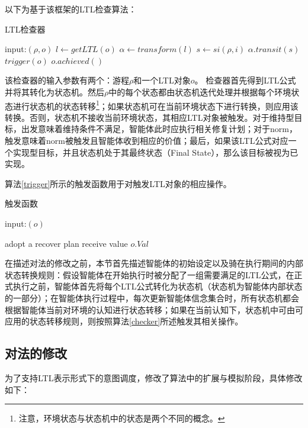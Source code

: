 以下为基于该框架的LTL检查算法：
\begin{algorithm} %
\caption{LTL检查器}\label{checker}
\begin{algorithmic}[1]
\STATE input:$(\rho, o)$
\STATE $l \gets getLTL(o)$
\STATE $\alpha \gets transform(l)$ 
  \STATE $s \gets si(\rho, i)$
    \STATE $\alpha.transit(s)$
    \ELSE
    \STATE $trigger(o)$
  \ENDIF
\ENDFOR
{}
  \STATE $o.achieved()$
\ENDIF
\end{algorithmic}
\end{algorithm}
该检查器的输入参数有两个：游程$\rho$和一个LTL对象$o$。
%
检查器首先得到LTL公式并将其转化为状态机。然后$\rho$中的每个状态都由状态机迭代处理并根据每个环境状态进行状态机的状态转移\footnote{注意，环境状态与状态机中的状态是两个不同的概念。}；如果状态机可在当前环境状态下进行转换，则应用该转换。否则，状态机不接收当前环境状态，其相应LTL对象被触发。对于维持型目标，出发意味着维持条件不满足，智能体此时应执行相关修复计划；对于norm，触发意味着norm被触发且智能体收到相应的价值；最后，如果该LTL公式对应一个实现型目标，并且状态机处于其最终状态（Final State），那么该目标被视为已实现。

算法\ref{trigger}所示的触发函数用于对触发LTL对象的相应操作。
\begin{algorithm} %
\caption{触发函数}\label{trigger}
\begin{algorithmic}[1]
\STATE input:$(o)$

\STATE adopt a recover plan
\ELSE
{}
\STATE receive value $o.Val$
\ENDIF
\ENDIF

\end{algorithmic}
\end{algorithm}

在描述对\SA 法的修改之前，本节首先描述智能体的初始设定以及骑在执行期间的内部状态转换规则：假设智能体在开始执行时被分配了一组需要满足的LTL公式，在正式执行之前，智能体首先将每个LTL公式转化为状态机（状态机为智能体内部状态的一部分）；在智能体执行过程中，每次更新智能体信念集合时，所有状态机都会根据智能体当前对环境的认知进行状态转移；如果在当前认知下，状态机中可由可应用的状态转移规则，则按照算法\ref{checker}所述触发其相关操作。

\subsection{对\SA 法的修改}
为了支持LTL表示形式下的意图调度，\SAT 修改了\SA 算法中的扩展与模拟阶段，具体修改如下：
